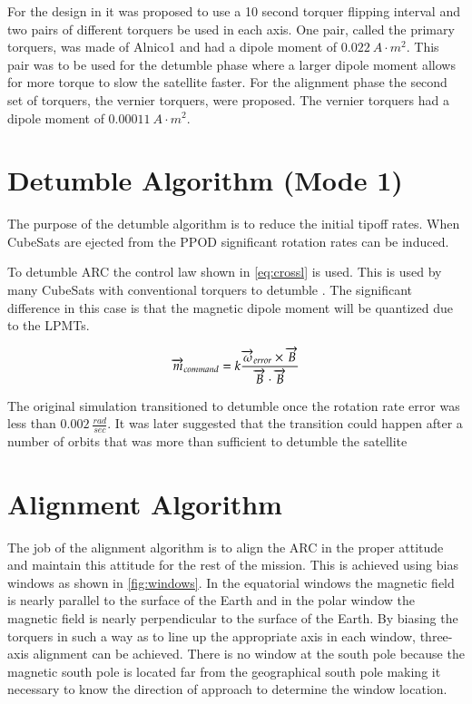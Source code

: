 For the design in \cite{Mentch11} it was proposed to use a 10 second torquer flipping interval and two pairs of different torquers be used in each axis. One pair, called the primary torquers, was made of Alnico1 and had a dipole moment of $0.022~\unit{A}{\cdot}\unit{m^2}$. This pair was to be used for the detumble phase where a larger dipole moment allows for more torque to slow the satellite faster. For the alignment phase the second set of torquers, the vernier torquers, were proposed. The vernier torquers had a dipole moment of $0.00011~\unit{A}{\cdot}\unit{m^2}$.

\section{Detumble Algorithm (Mode 1)}

The purpose of the detumble algorithm is to reduce the initial tipoff rates. When CubeSats are ejected from the \ac{PPOD} significant rotation rates can be induced.

To detumble \ac{ARC} the control law shown in \cref{eq:crossl} is used. This is used by many CubeSats with conventional torquers to detumble . The significant difference in this case is that the magnetic dipole moment will be quantized due to the \acp{LPMT}.

\begin{equation}
    \overrightarrow{m}_{command} = k {{\overrightarrow{\omega}_{error} \times \overrightarrow{B}} \over{\overrightarrow{B} \cdot \overrightarrow{B}}}
    \label{eq:crossl}
\end{equation}

The original simulation transitioned to detumble once the rotation rate error was less than $0.002~\unit{\frac{rad}{sec}}$. It was later suggested that the transition could happen after a number of orbits that was more than sufficient to detumble the satellite

\section{Alignment Algorithm}

The job of the alignment algorithm is to align the \ac{ARC} in the proper attitude and maintain this attitude for the rest of the mission. This is achieved using bias windows as shown in \cref{fig:windows}. In the equatorial windows the magnetic field is nearly parallel to the surface of the Earth and in the polar window the magnetic field is nearly perpendicular to the surface of the Earth. By biasing the torquers in such a way as to line up the appropriate axis in each window, three-axis alignment can be achieved. There is no window at the south pole because the magnetic south pole is located far from the geographical south pole making it necessary to know the direction of approach to determine the window location.

